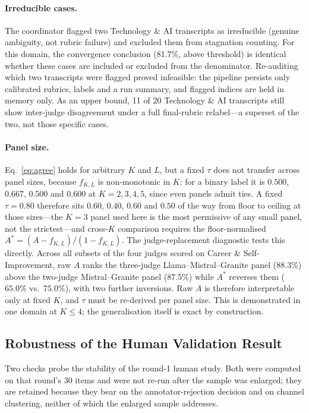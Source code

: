 \documentclass[letterpaper]{article}
\begin{document}
\paragraph{Irreducible cases.}
The coordinator flagged two Technology \& AI transcripts as irreducible
(genuine ambiguity, not rubric failure) and excluded them from stagnation
counting. For this domain, the convergence conclusion (81.7\%, above
threshold) is identical whether these cases are included or excluded from the
denominator. Re-auditing which two transcripts were flagged proved infeasible: the
pipeline persists only calibrated rubrics, labels and a run summary, and
flagged indices are held in memory only. As an upper bound, 11 of 20
Technology \& AI transcripts still show inter-judge disagreement under a full
final-rubric relabel---a superset of the two, not those specific cases.

\paragraph{Panel size.} Eq.~\ref{eq:agree} holds for arbitrary $K$ and $L$, but a
fixed $\tau$ does not transfer across panel sizes, because $f_{K,L}$ is
non-monotonic in $K$: for a binary label it is $0.500$, $0.667$, $0.500$ and
$0.600$ at $K = 2,3,4,5$, since even panels admit ties. A fixed $\tau = 0.80$
therefore sits $0.60$, $0.40$, $0.60$ and $0.50$ of the way from floor to ceiling
at those sizes---the $K = 3$ panel used here is the most permissive of any small
panel, not the strictest---and cross-$K$ comparison requires the floor-normalised
$A^{*} = (A - f_{K,L})/(1 - f_{K,L})$. The judge-replacement diagnostic tests this directly. Across all subsets of
the four judges scored on Career \& Self-Improvement, raw $A$ ranks the
three-judge Llama--Mistral--Granite panel ($88.3\%$) above the two-judge
Mistral--Granite panel ($87.5\%$) while $A^{*}$ reverses them ($65.0\%$
vs.\ $75.0\%$), with two further inversions. Raw $A$ is therefore
interpretable only at fixed $K$, and $\tau$ must be re-derived per panel size.
This is demonstrated in one domain at $K \le 4$; the generalisation itself is
exact by construction.


\subsection{Robustness of the Human Validation Result}
\label{sec:robustness}

Two checks probe the stability of the round-1 human study. Both were computed
on that round's 30 items and were not re-run after the sample was enlarged;
they are retained because they bear on the annotator-rejection decision and on
channel clustering, neither of which the enlarged sample addresses.
\end{document}
